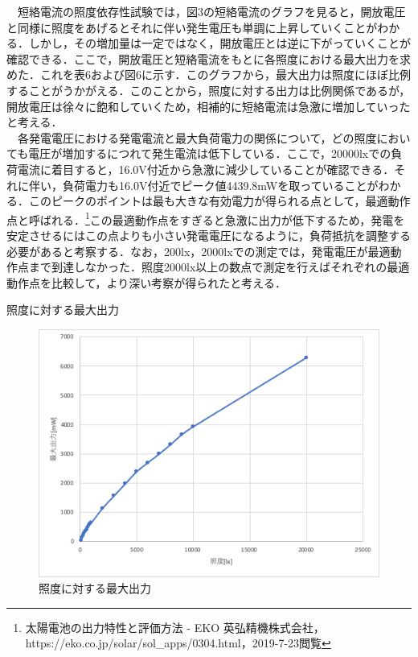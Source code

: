 　短絡電流の照度依存性試験では，図3の短絡電流のグラフを見ると，開放電圧と同様に照度をあげるとそれに伴い発生電圧も単調に上昇していくことがわかる．しかし，その増加量は一定ではなく，開放電圧とは逆に下がっていくことが確認できる．ここで，開放電圧と短絡電流をもとに各照度における最大出力を求めた．これを表6および図6に示す．このグラフから，最大出力は照度にほぼ比例することがうかがえる．このことから，照度に対する出力は比例関係であるが，開放電圧は徐々に飽和していくため，相補的に短絡電流は急激に増加していったと考える．\\

　各発電電圧における発電電流と最大負荷電力の関係について，どの照度においても電圧が増加するにつれて発生電流は低下している．ここで，20000lxでの負荷電流に着目すると，16.0V付近から急激に減少していることが確認できる．それに伴い，負荷電力も16.0V付近でピーク値4439.8mWを取っていることがわかる．このピークのポイントは最も大きな有効電力が得られる点として，最適動作点と呼ばれる．\footnote{太陽電池の出力特性と評価方法 - EKO 英弘精機株式会社，https://eko.co.jp/solar/sol\_apps/0304.html，2019-7-23閲覧}この最適動作点をすぎると急激に出力が低下するため，発電を安定させるにはこの点よりも小さい発電電圧になるように，負荷抵抗を調整する必要があると考察する．なお，200lx，2000lxでの測定では，発電電圧が最適動作点まで到達しなかった．照度2000lx以上の数点で測定を行えばそれぞれの最適動作点を比較して，より深い考察が得られたと考える．

\newpage
\begin{table}[htbp]
  \centering
  \caption{照度に対する最大出力}
  
\end{table}

\begin{figure}[H]
  \centering
  \includegraphics[width=15cm]{./fig/fig06.png}
  \caption{照度に対する最大出力}
\end{figure}

\newpage
\theendnotes


